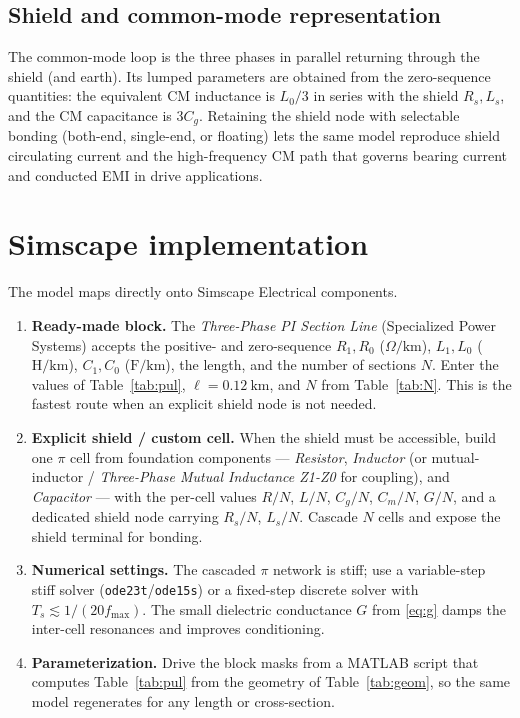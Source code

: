 \documentclass[11pt,a4paper]{article}
\begin{document}
\subsection{Shield and common-mode representation}
The common-mode loop is the three phases in parallel returning through the shield
(and earth). Its lumped parameters are obtained from the zero-sequence quantities:
the equivalent CM inductance is $L_0/3$ in series with the shield $R_s,L_s$, and
the CM capacitance is $3C_g$. Retaining the shield node with selectable bonding
(both-end, single-end, or floating) lets the same model reproduce shield
circulating current and the high-frequency CM path that governs bearing current
and conducted EMI in drive applications.

\section{Simscape implementation}\label{sec:simscape}
The model maps directly onto Simscape Electrical components.

\begin{enumerate}[leftmargin=*]
\item \textbf{Ready-made block.} The \emph{Three-Phase PI Section Line} (Specialized
Power Systems) accepts the positive- and zero-sequence $R_1,R_0$
($\Omega/\mathrm{km}$), $L_1,L_0$ ($\mathrm{H/km}$), $C_1,C_0$
($\mathrm{F/km}$), the length, and the number of sections $N$. Enter the values
of Table~\ref{tab:pul}, $\ell=0.12\ \mathrm{km}$, and $N$ from
Table~\ref{tab:N}. This is the fastest route when an explicit shield node is not
needed.
\item \textbf{Explicit shield / custom cell.} When the shield must be accessible,
build one $\pi$ cell from foundation components --- \emph{Resistor},
\emph{Inductor} (or mutual-inductor / \emph{Three-Phase Mutual Inductance Z1-Z0}
for coupling), and \emph{Capacitor} --- with the per-cell values $R/N$, $L/N$,
$C_g/N$, $C_m/N$, $G/N$, and a dedicated shield node carrying $R_s/N$, $L_s/N$.
Cascade $N$ cells and expose the shield terminal for bonding.
\item \textbf{Numerical settings.} The cascaded $\pi$ network is stiff; use a
variable-step stiff solver (\texttt{ode23t}/\texttt{ode15s}) or a fixed-step
discrete solver with $T_s \lesssim 1/(20 f_{\max})$. The small dielectric
conductance $G$ from \eqref{eq:g} damps the inter-cell resonances and improves
conditioning.
\item \textbf{Parameterization.} Drive the block masks from a MATLAB script that
computes Table~\ref{tab:pul} from the geometry of Table~\ref{tab:geom}, so the same
model regenerates for any length or cross-section.
\end{enumerate}
\end{document}
